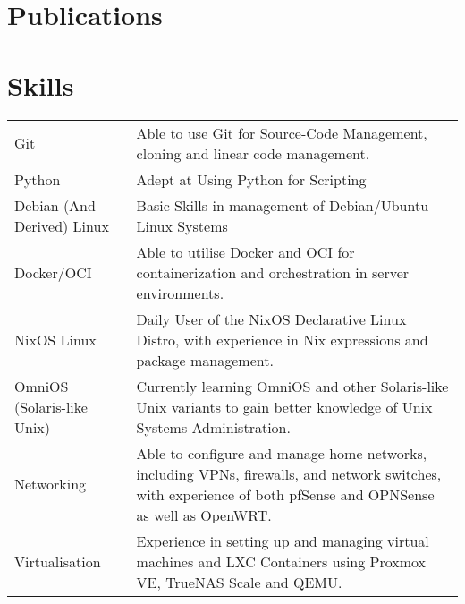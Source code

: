 \documentclass[a4paper,12pt]{article}
\begin{document}
\section{Publications}
\begin{refsection}
\nocite{sfm2024}
\printbibliography[heading=none]
\end{refsection}

\section{Skills}
\begin{tabularx}{\linewidth}{@{}l X@{}}
Git &  \normalsize{Able to use Git for Source-Code Management, cloning and linear code management.}\\
Python  &  \normalsize{Adept at Using Python for Scripting}\\ 
Debian (And Derived) Linux  &  \normalsize{Basic Skills in management of Debian/Ubuntu Linux Systems}\\ 
Docker/OCI  &  \normalsize{Able to utilise Docker and OCI for containerization and orchestration in server environments.}\\ 
NixOS Linux  &  \normalsize{Daily User of the NixOS Declarative Linux Distro, with experience in Nix expressions and package management.}\\ 
OmniOS (Solaris-like Unix)  &  \normalsize{Currently learning OmniOS and other Solaris-like Unix variants to gain better knowledge of Unix Systems Administration.}\\ 
Networking  &  \normalsize{Able to configure and manage home networks, including VPNs, firewalls, and network switches, with experience of both pfSense and OPNSense as well as OpenWRT.}\\
Virtualisation  &  \normalsize{Experience in setting up and managing virtual machines and LXC Containers using Proxmox VE, TrueNAS Scale and QEMU.}\\

\end{tabularx}

\vfill
{}
\end{document}
